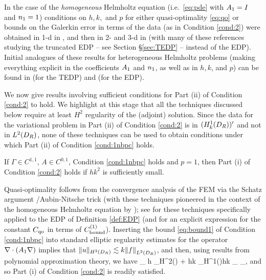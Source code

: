 In the case of the \emph{homogeneous} Helmholtz equation (i.e.~\eqref{eq:pde} with $A_{1}= I$ and $n_{1}=1$) conditions on $h,k,$ and $p$ for either quasi-optimality \eqref{eq:qo} or bounds on the Galerkin error in terms of the data (as in Condition \ref{cond:2}) were obtained in 1-d in \cite{IhBa:95, IhBa:97}, and then in 2- and 3-d in \cite{Me:95, Sa:06, MeSa:10, MeSa:11, Wu:13, ZhWu:13, ChNi:18} (with many of these references studying the truncated EDP -- see Section \S\ref{sec:TEDP} -- instead of the EDP). 
Initial analogues of these results for heterogeneous Helmholtz problems (making everything explicit in the coefficients $A_{1}$ and $n_{1}$, as well as in $h, k$, and $p$) can be found in \cite{GrSa:18} (for the TEDP) and \cite{GaSpWu:18} (for the EDP).
 
We now give results involving sufficient conditions for Part (ii) of Condition \ref{cond:2}  to hold. 
We highlight at this stage that all the techniques discussed below
require at least $H^2$ regularity of the (adjoint) solution. Since the data for the variational problem in Part (ii) of Condition \ref{cond:2} is in $(\HokDR)'$ and not in $\LtDR$, none of these techniques can be used to obtain conditions under which Part (ii) of Condition \ref{cond:1nbpc} holds.

\ble[Conditions under which Part (i) of Condition \ref{cond:2} holds when $p=1$]\label{lem:hp1}
If $\Gamma\in C^{1,1}$, $A\in C^{0,1}$, Condition \ref{cond:1nbpc} holds and $p=1$, then Part (i) of Condition \ref{cond:2} holds
if $h k^2$ is sufficiently small. 
\ele

Quasi-optimality follows from the convergence analysis of the FEM via the Schatz argument \cite{Sc:74}/Aubin-Nitsche trick (with these techniques pioneered in the context of the homogeneous Helmholtz equation by \cite{Me:95, Sa:06, MeSa:10, MeSa:11}); see \cite[\S6]{GaSpWu:18} for these techniques specifically applied to the EDP of Definition \ref{def:EDP} (and for an explicit expression for the constant $C_{\rm qo}$ in terms of $C_{\rm bound}^{(1)}$). 
Inserting the bound  \eqref{eq:bound1} of Condition \ref{cond:1nbpc} into standard elliptic regularity estimates for the operator $\nabla\cdot(A_{1}\nabla )$ implies that $\|u\|_{H^2(\DR)}\lesssim k\N{f}_{\LtDR}$, and then, using results from polynomial approximation theory, we have
 \beq\label{eq:AN1}
_{\HokDR} \lesssim h _{H^2(\DR)} + hk _{H^1(\DR)}\lesssim hk _{\LtDR} \lesssim {}_{\LtDR},
\eeq
and so Part (i) of Condition \ref{cond:2} is readily satisfied.
\epf

